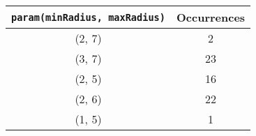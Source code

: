 \documentclass[letterpaper, 12pt]{article}
\begin{document}
\begin{longtable}{|c|c|}
\hline
\textbf{\texttt{param(minRadius, maxRadius)}} & \textbf{Occurrences} \\
\hline
(2, 7) & 2 \\
\hline
(3, 7) & 23 \\
\hline
(2, 5) & 16 \\
\hline
(2, 6) & 22 \\
\hline
(1, 5) & 1 \\
\hline
\end{longtable}
\end{document}
